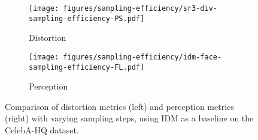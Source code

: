 \begin{figure}[t]
     \centering
     \begin{subfigure}[b]{0.23\textwidth}
         \centering
         \texttt{[image: figures/sampling-efficiency/sr3-div-sampling-efficiency-PS.pdf]}
         \caption{Distortion}
         \label{fig:idm-face-sampling-ps}
     \end{subfigure}
     \begin{subfigure}[b]{0.242\textwidth}
         \centering
         \texttt{[image: figures/sampling-efficiency/idm-face-sampling-efficiency-FL.pdf]}
         \caption{Perception}
         \label{fig:idm-face-sampling-fl}
     \end{subfigure}
     \vspace{-.28in}
         \caption{Comparison of distortion metrics (left) and perception metrics (right) with varying sampling steps, using  IDM as a baseline on the CelebA-HQ dataset.}
        \label{fig:idm-face-sampling}
        \vspace{-.1in}
\end{figure}

